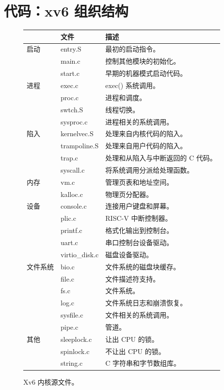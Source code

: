 \section{代码：xv6 组织结构}

\begin{figure}[t]
\centering
\begin{tabular}{l|l|l}
& {\bf 文件} & {\bf 描述} \\
\midrule
启动 & entry.S & 最初的启动指令。 \\
 & main.c & 控制其他模块的初始化。 \\
 & start.c & 早期的机器模式启动代码。 \\
进程 & exec.c & exec() 系统调用。 \\
 & proc.c & 进程和调度。 \\
 & swtch.S & 线程切换。 \\
 & sysproc.c & 进程相关的系统调用。 \\
陷入 & kernelvec.S & 处理来自内核代码的陷入。 \\
 & trampoline.S & 处理来自用户代码的陷入。 \\
 & trap.c & 处理和从陷入与中断返回的 C 代码。 \\
 & syscall.c & 将系统调用分派给处理函数。 \\
内存 & vm.c & 管理页表和地址空间。 \\
 & kalloc.c & 物理页分配器。 \\
设备 & console.c & 连接用户键盘和屏幕。 \\
 & plic.c & RISC-V 中断控制器。 \\
 & printf.c & 格式化输出到控制台。 \\
 & uart.c & 串口控制台设备驱动。 \\
 & virtio\_disk.c & 磁盘设备驱动。 \\
文件系统 & bio.c & 文件系统的磁盘块缓存。 \\
 & file.c & 文件描述符支持。 \\
 & fs.c & 文件系统。 \\
 & log.c & 文件系统日志和崩溃恢复。 \\
 & sysfile.c & 文件相关的系统调用。 \\
 & pipe.c & 管道。 \\
其他 & sleeplock.c & 让出 CPU 的锁。 \\
 & spinlock.c & 不让出 CPU 的锁。 \\
 & string.c & C 字符串和字节数组库。 \\
\end{tabular}
\caption{Xv6 内核源文件。}
\label{fig:source}
\end{figure}

